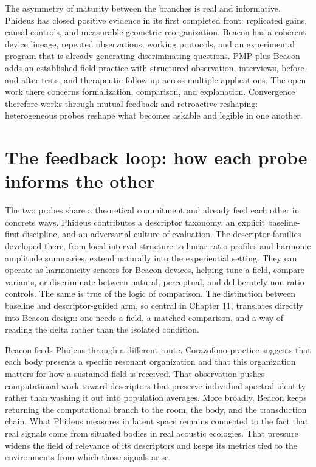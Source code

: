 The asymmetry of maturity between the branches is real and informative. Phideus has closed positive evidence in its first completed front: replicated gains, causal controls, and measurable geometric reorganization. Beacon has a coherent device lineage, repeated observations, working protocols, and an experimental program that is already generating discriminating questions. PMP plus Beacon adds an established field practice with structured observation, interviews, before-and-after tests, and therapeutic follow-up across multiple applications. The open work there concerns formalization, comparison, and explanation. Convergence therefore works through mutual feedback and retroactive reshaping: heterogeneous probes reshape what becomes askable and legible in one another.


\section{The feedback loop: how each probe informs the other}


The two probes share a theoretical commitment and already feed each other in concrete ways. Phideus contributes a descriptor taxonomy, an explicit baseline-first discipline, and an adversarial culture of evaluation. The descriptor families developed there, from local interval structure to linear ratio profiles and harmonic amplitude summaries, extend naturally into the experiential setting. They can operate as harmonicity sensors for Beacon devices, helping tune a field, compare variants, or discriminate between natural, perceptual, and deliberately non-ratio controls. The same is true of the logic of comparison. The distinction between baseline and descriptor-guided arm, so central in Chapter 11, translates directly into Beacon design: one needs a field, a matched comparison, and a way of reading the delta rather than the isolated condition.

Beacon feeds Phideus through a different route. Corazofono practice suggests that each body presents a specific resonant organization and that this organization matters for how a sustained field is received. That observation pushes computational work toward descriptors that preserve individual spectral identity rather than washing it out into population averages. More broadly, Beacon keeps returning the computational branch to the room, the body, and the transduction chain. What Phideus measures in latent space remains connected to the fact that real signals come from situated bodies in real acoustic ecologies. That pressure widens the field of relevance of its descriptors and keeps its metrics tied to the environments from which those signals arise.

